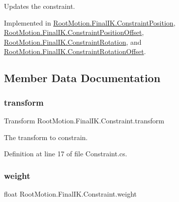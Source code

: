 Updates the constraint. 



Implemented in \mbox{\hyperlink{class_root_motion_1_1_final_i_k_1_1_constraint_position_a872cfb0d7c9de48b4848fcc931e838c1}{Root\+Motion.\+Final\+I\+K.\+Constraint\+Position}}, \mbox{\hyperlink{class_root_motion_1_1_final_i_k_1_1_constraint_position_offset_a0b9bf29de200b4f52e88dd817e989ceb}{Root\+Motion.\+Final\+I\+K.\+Constraint\+Position\+Offset}}, \mbox{\hyperlink{class_root_motion_1_1_final_i_k_1_1_constraint_rotation_a0207bba5082e69f78a72cf7154431159}{Root\+Motion.\+Final\+I\+K.\+Constraint\+Rotation}}, and \mbox{\hyperlink{class_root_motion_1_1_final_i_k_1_1_constraint_rotation_offset_a5116eea04782bf913c98dadb380cf8cc}{Root\+Motion.\+Final\+I\+K.\+Constraint\+Rotation\+Offset}}.



\subsection{Member Data Documentation}
\mbox{\label{class_root_motion_1_1_final_i_k_1_1_constraint_a2fe5a6e41ac6da0e5cb97a231696f937}} 
\subsubsection{\texorpdfstring{transform}{transform}}
{\footnotesize\ttfamily Transform Root\+Motion.\+Final\+I\+K.\+Constraint.\+transform}



The transform to constrain. 



Definition at line 17 of file Constraint.\+cs.

\mbox{\label{class_root_motion_1_1_final_i_k_1_1_constraint_a41921a1cb4b1605c80ce3b3ae7ac0786}} 
\subsubsection{\texorpdfstring{weight}{weight}}
{\footnotesize\ttfamily float Root\+Motion.\+Final\+I\+K.\+Constraint.\+weight}



